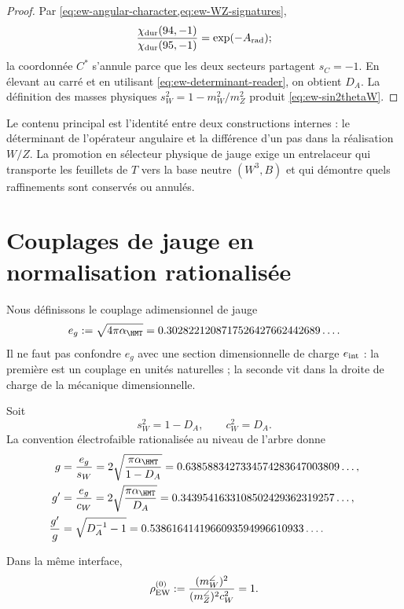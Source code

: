 \begin{proof}
Par \cref{eq:ew-angular-character,eq:ew-WZ-signatures},
\[
\frac{\chi_{\rm dur}(94,-1)}{\chi_{\rm dur}(95,-1)}
=\exp(-A_{\rm rad});
\]
la coordonnée \(C^*\) s'annule parce que les deux secteurs partagent
\(s_C=-1\). En élevant au carré et en utilisant
\cref{eq:ew-determinant-reader}, on obtient \(D_A\). La définition
des masses physiques \(s_W^2=1-m_W^2/m_Z^2\) produit
\cref{eq:ew-sin2thetaW}.
\end{proof}

Le contenu principal est l'identité entre deux constructions
internes : le déterminant de l'opérateur angulaire et la différence d'un pas
dans la réalisation \(W/Z\). La promotion en sélecteur physique de jauge exige
un entrelaceur qui transporte les feuillets de \(T\) vers la base neutre
\((W^3,B)\) et qui démontre quels raffinements sont conservés ou annulés.

\section{Couplages de jauge en normalisation rationalisée}

Nous définissons le couplage adimensionnel de jauge
\begin{equation}
\label{eq:ew-egauge}
e_g:=\sqrt{4\pi\alpha_{\HMT}}
=0.3028221208717526427662442689\ldots .
\end{equation}
Il ne faut pas confondre \(e_g\) avec une section dimensionnelle de charge
\(e_{\rm int}\) : la première est un couplage en unités naturelles ; la
seconde vit dans la droite de charge de la mécanique dimensionnelle.

Soit
\begin{equation}
\label{eq:ew-sw-cw}
s_W^2=1-D_A,
\qquad
c_W^2=D_A.
\end{equation}
La convention électrofaible rationalisée au niveau de l'arbre donne
\begin{align}
g&=\frac{e_g}{s_W}
=2\sqrt{\frac{\pi\alpha_{\HMT}}{1-D_A}}
=0.6385883427334574283647003809\ldots,
\label{eq:ew-g}\\
g'&=\frac{e_g}{c_W}
=2\sqrt{\frac{\pi\alpha_{\HMT}}{D_A}}
=0.3439541633108502429362319257\ldots,
\label{eq:ew-gprime}\\
\frac{g'}{g}
&=\sqrt{D_A^{-1}-1}
=0.5386164141966093594996610933\ldots .
\label{eq:ew-gprime-over-g}
\end{align}

\begin{proposition}
\label{prop:ew-rho}
Dans la même interface,
\begin{equation}
\label{eq:ew-rho}
\rho_{\rm EW}^{(0)}
:=\frac{(m_W^{\angle})^2}
{(m_Z^{\angle})^2c_W^2}=1.
\end{equation}
\end{proposition}

